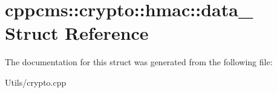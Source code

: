 \hypertarget{structcppcms_1_1crypto_1_1hmac_1_1data__}{\section{cppcms\-:\-:crypto\-:\-:hmac\-:\-:data\-\_\- Struct Reference}
\label{structcppcms_1_1crypto_1_1hmac_1_1data__}
}


The documentation for this struct was generated from the following file\-:\begin{DoxyCompactItemize}
\item 
Utils/crypto.\-cpp\end{DoxyCompactItemize}
